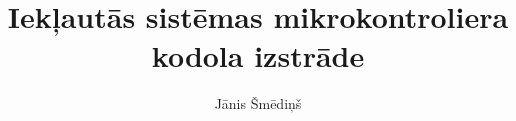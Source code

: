 \documentclass[xetex]{beamer} %
\author{Jānis Šmēdiņš}
\title[Mikrokontroliera kodola izstrāde]
	{Iekļautās sistēmas mikrokontroliera kodola izstrāde}
\begin{document}
	\begin{frame}
		\titlepage 	%
	\end{frame}
	
\end{document}

